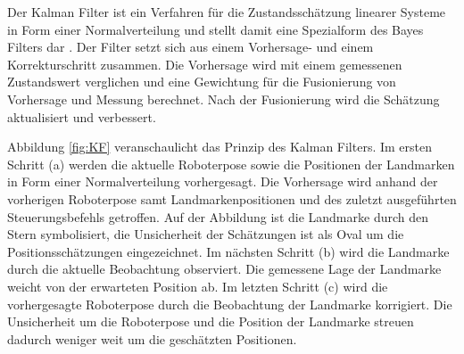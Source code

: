%
%
%

Der Kalman Filter ist ein Verfahren für die Zustandsschätzung linearer Systeme in Form einer Normalverteilung und stellt damit eine Spezialform des Bayes Filters dar \cite{Stachniss2016}. Der Filter setzt sich aus einem Vorhersage- und einem Korrekturschritt zusammen. Die Vorhersage wird mit einem gemessenen Zustandswert verglichen und eine Gewichtung für die Fusionierung von Vorhersage und Messung berechnet. Nach der Fusionierung wird die Schätzung aktualisiert und verbessert.

Abbildung \ref{fig:KF} veranschaulicht das Prinzip des Kalman Filters. Im ersten Schritt (a) werden die aktuelle Roboterpose sowie die Positionen der Landmarken in Form einer Normalverteilung vorhergesagt. Die Vorhersage wird anhand der vorherigen Roboterpose samt Landmarkenpositionen und des zuletzt ausgeführten Steuerungsbefehls getroffen. Auf der Abbildung ist die Landmarke durch den Stern symbolisiert, die Unsicherheit der Schätzungen ist als Oval um die Positionsschätzungen ein\-ge\-zeich\-net. Im nächsten Schritt (b) wird die Landmarke durch die aktuelle Beobachtung observiert. Die gemessene Lage der Landmarke weicht von der erwarteten Position ab. Im letz\-ten Schritt (c) wird die vorhergesagte Roboterpose durch die Beobachtung der Landmarke korrigiert. Die Unsicherheit um die Roboterpose und die Position der Landmarke streuen dadurch weniger weit um die geschätzten Positionen. 

